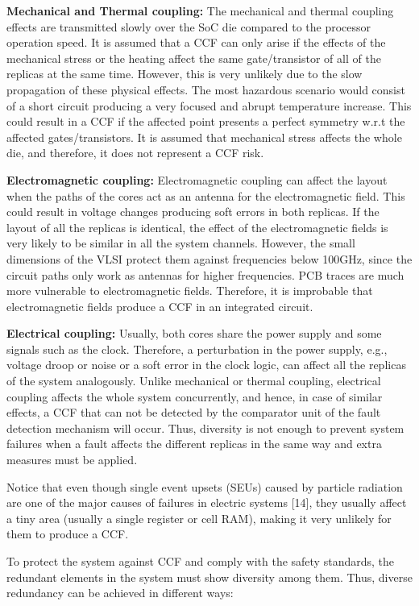 \textbf{Mechanical and Thermal coupling:} The mechanical and thermal coupling effects are transmitted slowly over the SoC die compared to the processor operation speed. It is assumed that a CCF can only arise if the effects of the mechanical stress or the heating affect the same gate/transistor of all of the replicas at the same time. However, this is very unlikely due to the slow propagation of these physical effects. The most hazardous scenario would consist of a short circuit producing a very focused and abrupt temperature increase. This could result in a CCF if the affected point presents a perfect symmetry w.r.t the affected gates/transistors. It is assumed that mechanical stress affects the whole die, and therefore, it does not represent a CCF risk. 

\textbf{Electromagnetic coupling:} Electromagnetic coupling can affect the layout when the paths of the cores act as an antenna for the electromagnetic field. This could result in voltage changes producing soft errors in both replicas. If the layout of all the replicas is identical, the effect of the electromagnetic fields is very likely to be similar in all the system channels. However, the small dimensions of the VLSI protect them against frequencies below 100GHz, since the circuit paths only work as antennas for higher frequencies. PCB traces are much more vulnerable to electromagnetic fields. Therefore, it is improbable that electromagnetic fields produce a CCF in an integrated circuit.

\textbf{Electrical coupling:} Usually, both cores share the power supply and some signals such as the clock. Therefore, a perturbation in the power supply, e.g., voltage droop or noise or a soft error in the clock logic, can affect all the replicas of the system analogously. Unlike mechanical or thermal coupling, electrical coupling affects the whole system concurrently, and hence, in case of similar effects, a CCF that can not be detected by the comparator unit of the fault detection mechanism will occur. Thus, diversity is not enough to prevent system failures when a fault affects the different replicas in the same way and extra measures must be applied. 

Notice that even though single event upsets (SEUs) caused by particle radiation are one of the major causes of failures in electric systems [14], they usually affect a tiny area (usually a single register or cell RAM), making it very unlikely for them to produce a CCF.   

To protect the system against CCF and comply with the safety standards, the redundant elements in the system must show diversity among them. Thus, diverse redundancy can be achieved in different ways: 

